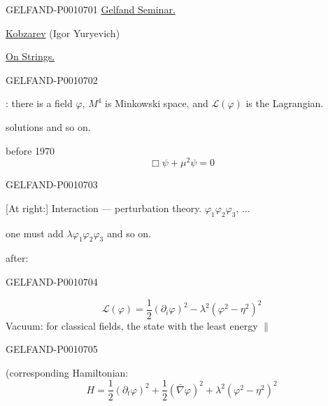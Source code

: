 \begin{GelfandAdjacentEvidence}{GELFAND-P001070}{1}
 \uline{Gelfand Seminar.}

\uline{Kobzarev} (Igor Yuryevich)

\uline{On Strings.}
\end{GelfandAdjacentEvidence}
\begin{GelfandAdjacentEvidence}{GELFAND-P001070}{2}


: there is a field $\varphi$, $M^4$ is Minkowski space, and $\mathcal L(\varphi)$ is the Lagrangian.

solutions and so on.


before 1970
\begin{equation*}
\Box\psi+\mu^2\psi=0
\tag{1}
\end{equation*}
\end{GelfandAdjacentEvidence}
\begin{GelfandAdjacentEvidence}{GELFAND-P001070}{3}

[At right:] Interaction — perturbation theory. $\varphi_1\varphi_2\varphi_3$, $\ldots$

one must add $\lambda\varphi_1\varphi_2\varphi_3$ and so on.

after: 
\end{GelfandAdjacentEvidence}
\begin{GelfandAdjacentEvidence}{GELFAND-P001070}{4}

\begin{equation*}
\mathcal{L}(\varphi)=\frac12(\partial_i\varphi)^2-\lambda^2(\varphi^2-\eta^2)^2
\tag{2}
\end{equation*}
Vacuum: for classical fields, the state with the least energy \(\parallel\)
\end{GelfandAdjacentEvidence}
\begin{GelfandAdjacentEvidence}{GELFAND-P001070}{5}


(corresponding Hamiltonian:
\begin{equation*}
H=\frac12(\partial_t\varphi)^2+\frac12(\bar\nabla\varphi)^2+\lambda^2(\varphi^2-\eta^2)^2
\tag{3}
\end{equation*}
\end{GelfandAdjacentEvidence}
